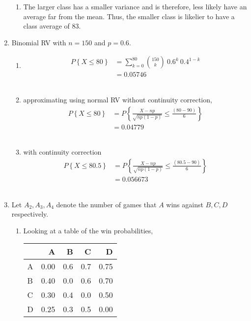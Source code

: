 \begin{enumerate}
\begin{enumerate}
			\item The larger class has a smaller variance and is therefore, less likely have an average far from the mean. Thus, the smaller class is likelier to have a class average of 83.
		\end{enumerate}
	
	
	\item Binomial RV with $ n = 150$ and $ p = 0.6 $. \\
	
		\begin{enumerate}
			\item \begin{align}
				P \left\{X \leq 80 \right\} &=  \sum\limits_{k=0}^{80} \binom{150}{k}\ 0.6^k\ 0.4^{1-k}\nonumber \\
				&= 0.05746
			\end{align}\\
			
			\item approximating using normal RV without continuity correction, \\
			\begin{align}
				P \left\{X \leq 80 \right\} &= P \left\{ \frac{X - np}{\sqrt{np(1-p)}} \leq \frac{(80 - 90)}{6} \right\} \nonumber \\
				&= 0.04779
			\end{align}\\
			
			\item with continuity correction\\
			\begin{align}
				P \left\{X \leq 80.5 \right\} &= P \left\{ \frac{X - np}{\sqrt{np(1-p)}} \leq \frac{(80.5 - 90)}{6} \right\} \nonumber \\
				&= 0.056673
			\end{align}\\
		\end{enumerate}
	
	
	\item Let $ A_2, A_3, A_4 $ denote the number of games that $ A $ wins against $ B, C, D $ respectively.\\
	
		\begin{enumerate}
			\item Looking at a table of the win probabilities,\\
			
			\begin{table}[H]
				\centering
				\begin{tabular}{@{}l|rrrr@{}}
					\toprule
					{} &     A &    B &    C &     D \\
					\midrule
					A &  0.00 &  0.6 &  0.7 &  0.75 \\
					B &  0.40 &  0.0 &  0.6 &  0.70 \\
					C &  0.30 &  0.4 &  0.0 &  0.50 \\
					D &  0.25 &  0.3 &  0.5 &  0.00 \\
					\bottomrule
				\end{tabular}
			\end{table}
			

\end{enumerate}
\end{enumerate}
